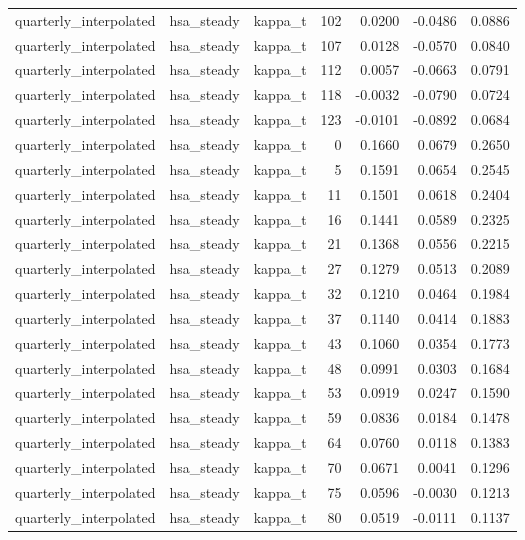 \begin{tabular}{lllrrrr}
quarterly\_interpolated & hsa\_steady & kappa\_t & 102 & 0.0200 & -0.0486 & 0.0886 \\
quarterly\_interpolated & hsa\_steady & kappa\_t & 107 & 0.0128 & -0.0570 & 0.0840 \\
quarterly\_interpolated & hsa\_steady & kappa\_t & 112 & 0.0057 & -0.0663 & 0.0791 \\
quarterly\_interpolated & hsa\_steady & kappa\_t & 118 & -0.0032 & -0.0790 & 0.0724 \\
quarterly\_interpolated & hsa\_steady & kappa\_t & 123 & -0.0101 & -0.0892 & 0.0684 \\
quarterly\_interpolated & hsa\_steady & kappa\_t & 0 & 0.1660 & 0.0679 & 0.2650 \\
quarterly\_interpolated & hsa\_steady & kappa\_t & 5 & 0.1591 & 0.0654 & 0.2545 \\
quarterly\_interpolated & hsa\_steady & kappa\_t & 11 & 0.1501 & 0.0618 & 0.2404 \\
quarterly\_interpolated & hsa\_steady & kappa\_t & 16 & 0.1441 & 0.0589 & 0.2325 \\
quarterly\_interpolated & hsa\_steady & kappa\_t & 21 & 0.1368 & 0.0556 & 0.2215 \\
quarterly\_interpolated & hsa\_steady & kappa\_t & 27 & 0.1279 & 0.0513 & 0.2089 \\
quarterly\_interpolated & hsa\_steady & kappa\_t & 32 & 0.1210 & 0.0464 & 0.1984 \\
quarterly\_interpolated & hsa\_steady & kappa\_t & 37 & 0.1140 & 0.0414 & 0.1883 \\
quarterly\_interpolated & hsa\_steady & kappa\_t & 43 & 0.1060 & 0.0354 & 0.1773 \\
quarterly\_interpolated & hsa\_steady & kappa\_t & 48 & 0.0991 & 0.0303 & 0.1684 \\
quarterly\_interpolated & hsa\_steady & kappa\_t & 53 & 0.0919 & 0.0247 & 0.1590 \\
quarterly\_interpolated & hsa\_steady & kappa\_t & 59 & 0.0836 & 0.0184 & 0.1478 \\
quarterly\_interpolated & hsa\_steady & kappa\_t & 64 & 0.0760 & 0.0118 & 0.1383 \\
quarterly\_interpolated & hsa\_steady & kappa\_t & 70 & 0.0671 & 0.0041 & 0.1296 \\
quarterly\_interpolated & hsa\_steady & kappa\_t & 75 & 0.0596 & -0.0030 & 0.1213 \\
quarterly\_interpolated & hsa\_steady & kappa\_t & 80 & 0.0519 & -0.0111 & 0.1137 \\

\end{tabular}
